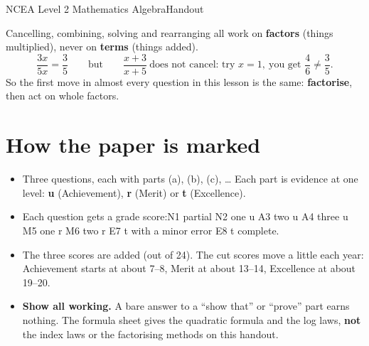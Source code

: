 \documentclass[11pt]{article}
\begin{document}
  {NCEA Level 2 Mathematics \textperiodcentered{} Algebra}{Handout}

\begin{keybox}[title={The one idea: factorise first}]
Cancelling, combining, solving and rearranging all work on \textbf{factors} (things multiplied), never on \textbf{terms} (things added).
\[ \frac{3x}{5x} = \frac{3}{5} \qquad\text{but}\qquad \frac{x+3}{x+5}\ \text{does not cancel: try } x=1,\ \text{you get } \frac{4}{6} \neq \frac{3}{5}. \]
So the first move in almost every question in this lesson is the same: \textbf{factorise}, then act on whole factors.
\end{keybox}

\section*{How the paper is marked}\label{h:marking}
\begin{itemize}
\item Three questions, each with parts (a), (b), (c), \ldots{} Each part is evidence at one level: \textbf{u} (Achievement), \textbf{r} (Merit) or \textbf{t} (Excellence).
\item Each question gets a grade score:\quad N1 partial \textperiodcentered{} N2 one u \textperiodcentered{} A3 two u \textperiodcentered{} A4 three u \textperiodcentered{} M5 one r \textperiodcentered{} M6 two r \textperiodcentered{} E7 t with a minor error \textperiodcentered{} E8 t complete.
\item The three scores are added (out of 24). The cut scores move a little each year: Achievement starts at about 7--8, Merit at about 13--14, Excellence at about 19--20.
\item \textbf{Show all working.} A bare answer to a ``show that'' or ``prove'' part earns nothing. The formula sheet gives the quadratic formula and the log laws, \textbf{not} the index laws or the factorising methods on this handout.
\end{itemize}

\end{document}

